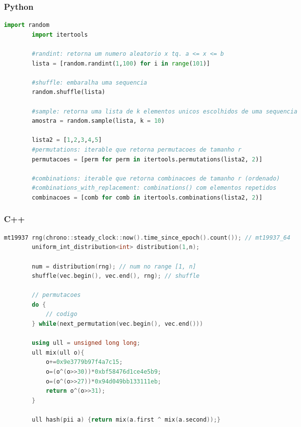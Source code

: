 \begin{multicols}{2}
    \subsubsection*{Python}
    
    \begin{lstlisting}[language=Python]
        import random
        import itertools
    
        #randint: retorna um numero aleatorio x tq. a <= x <= b
        lista = [random.randint(1,100) for i in range(101)]
    
        #shuffle: embaralha uma sequencia
        random.shuffle(lista)
    
        #sample: retorna uma lista de k elementos unicos escolhidos de uma sequencia
        amostra = random.sample(lista, k = 10)
    
        lista2 = [1,2,3,4,5]
        #permutations: iterable que retorna permutacoes de tamanho r
        permutacoes = [perm for perm in itertools.permutations(lista2, 2)]
        
        #combinations: iterable que retorna combinacoes de tamanho r (ordenado)
        #combinations_with_replacement: combinations() com elementos repetidos
        combinacoes = [comb for comb in itertools.combinations(lista2, 2)]
    \end{lstlisting}
    
    \subsubsection*{C++}
    
    \begin{lstlisting}[language=c++]
        mt19937 rng(chrono::steady_clock::now().time_since_epoch().count()); // mt19937_64
        uniform_int_distribution<int> distribution(1,n);
    
        num = distribution(rng); // num no range [1, n]
        shuffle(vec.begin(), vec.end(), rng); // shuffle
    
        // permutacoes 
        do {
            // codigo
        } while(next_permutation(vec.begin(), vec.end()))
    
        using ull = unsigned long long;
        ull mix(ull o){
            o+=0x9e3779b97f4a7c15;
            o=(o^(o>>30))*0xbf58476d1ce4e5b9;
            o=(o^(o>>27))*0x94d049bb133111eb;
            return o^(o>>31);
        }
    
        ull hash(pii a) {return mix(a.first ^ mix(a.second));}
    \end{lstlisting}
    
\end{multicols}
